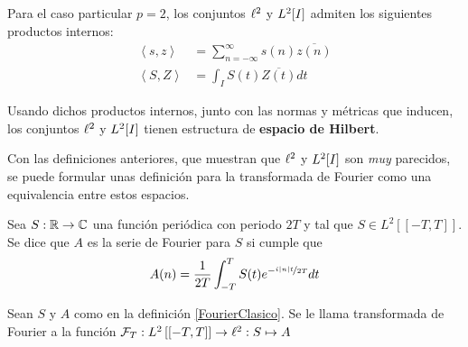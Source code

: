 Para el caso particular $p=2$, los conjuntos $\ell^{2}$ y $L^{2}[I]$ admiten los siguientes productos 
internos:
%
\begin{align*}
\left\langle s,z \right\rangle &= \sum_{n=-\infty}^{\infty} s(n) \overline{z(n)}\\
\left\langle S,Z \right\rangle &= \int_I S(t) \overline{Z(t)} dt
\end{align*}

Usando dichos productos internos, junto con las normas y métricas que inducen, los conjuntos 
$\ell^{2}$ y $L^{2}[I]$ tienen estructura de \textbf{espacio de Hilbert}.

Con las definiciones anteriores, que muestran que $\ell^{2}$ y $L^{2}[I]$ son \textit{muy}
parecidos, se puede formular unas definición para la transformada de Fourier como una equivalencia
entre estos espacios.


\begin{definicion}
Sea $S: \mathbb{R} \rightarrow \mathbb{C}$ una función periódica con periodo $2T$ y tal que 
$S \in L^{2}\left[[-T,T]\right]$. Se dice que $A$ es la serie de Fourier para $S$ si cumple que
\begin{equation*}
A(n) = \frac{1}{2 T} \int_{- T }^{ T } S(t) e^{-\nicefrac{ i \left| n \right| t}{2T}} dt
\end{equation*}
\label{FourierClasico}
\end{definicion}

\begin{definicion}
Sean $S$ y $A$ como en la definición \ref{FourierClasico}. Se le llama transformada de Fourier a la
función $\mathcal{F}_T : L^{2}\left[[-T,T]\right] \rightarrow \ell^{2} : S \mapsto A$
\end{definicion}

